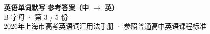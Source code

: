\documentclass[10pt,a4paper]{article}
\begin{document}
\pagestyle{plain}

\begin{center}
{\LARGE\bfseries 英语单词默写 \quad 参考答案（中 $\to$ 英）}\\[0.22em]
{\large B 字母 · 第 3 / 5 份}\\[0.18em]
{\small 2026年上海市高考英语词汇用法手册 · 参照普通高中英语课程标准}
\end{center}

\vspace{0.2em}
\noindent{\color{rulegray}\rule{\textwidth}{0.8pt}}

\vspace{0.35em}

\vspace{0.25em}
\renewcommand{\arraystretch}{1.32}
\end{document}
